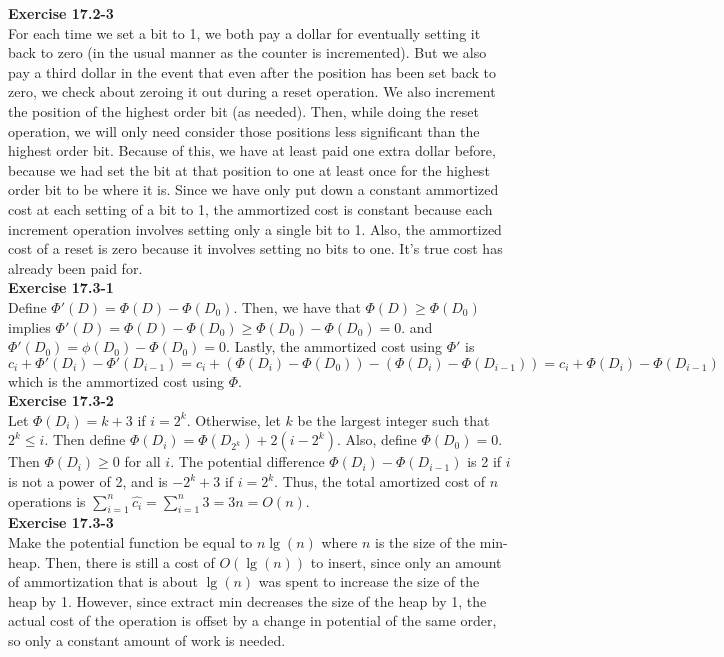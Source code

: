 \documentclass{article}
\begin{document}
\noindent\textbf{Exercise 17.2-3}\\

For each time we set a bit to 1, we both pay a dollar for eventually setting it back to zero (in the usual manner as the counter is incremented). But we also pay a third dollar in the event that even after the position has been set back to zero, we check about zeroing it out during a reset operation. We also increment the position of the highest order bit (as needed). Then, while doing the reset operation, we will only need consider those positions less significant than the highest order bit. Because of this, we have at least paid one extra dollar before, because we had set the bit at that position to one at least once for the highest order bit to be where it is. Since we have only put down a constant ammortized cost at each setting of a bit to 1, the ammortized cost is constant because each increment operation involves setting only a single bit to 1. Also, the ammortized cost of a reset is zero because it involves setting no bits to one. It's true cost has already been paid for.\\

\noindent\textbf{Exercise 17.3-1}\\

Define $\Phi'(D) = \Phi(D) -\Phi(D_0)$. Then, we have that $\Phi(D) \ge \Phi(D_0)$ implies $\Phi'(D)  = \Phi(D) - \Phi(D_0) \ge \Phi(D_0) -\Phi(D_0) = 0$. and $\Phi'(D_0) = \phi(D_0)-\Phi(D_0) = 0$. Lastly, the ammortized cost using $\Phi'$ is $c_i + \Phi'(D_i) -\Phi'(D_{i-1}) = c_i + (\Phi(D_i) - \Phi(D_0)) - (\Phi(D_i) -\Phi(D_{i-1})) = c_i + \Phi(D_i) -\Phi(D_{i-1})$ which is the ammortized cost using $\Phi$.\\

\noindent\textbf{Exercise 17.3-2}\\

Let $\Phi(D_i) = k+3$ if $i =  2^k$.  Otherwise, let $k$ be the largest integer such that $2^k \leq i$.  Then define $\Phi(D_i) = \Phi(D_{2^k}) + 2(i-2^k)$.   Also, define $\Phi(D_0) = 0$.  Then $\Phi(D_i) \geq 0$ for all $i$.  The potential difference $\Phi(D_i) - \Phi(D_{i-1})$ is 2 if $i$ is not a power of 2, and is $-2^k + 3$ if $i=2^k$.   Thus, the total amortized cost of $n$ operations is $\sum_{i=1}^n \hat{c_i} = \sum_{i=1}^n 3 = 3n = O(n)$.  \\


\noindent\textbf{Exercise 17.3-3}\\

Make the potential function be equal to $n\lg(n)$ where $n$ is the size of the min-heap. Then, there is still a cost of $O(\lg(n))$ to insert, since only an amount of ammortization that is about $\lg(n)$ was spent to increase the size of the heap by 1. However, since extract min decreases the size of the heap by 1, the actual cost of the operation is offset by a change in potential of the same order, so only a constant amount of work is needed.\\
 
\end{document}
